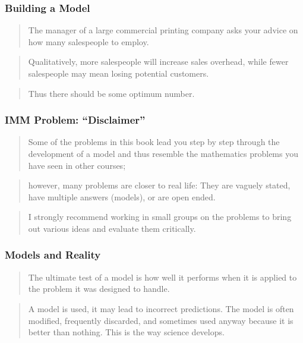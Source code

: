 \begin{frame}
    \frametitle{Building a Model}
    \begin{verse}
        The manager of a large commercial printing company 
        asks your advice on how many salespeople to employ.  
    \end{verse}
    \begin{verse}
        Qualitatively, more salespeople will increase sales overhead,
        while fewer salespeople may mean losing potential customers. 
    \end{verse}
    \begin{verse}
       Thus there should be some optimum number.
    \end{verse}
    
\end{frame}


\begin{frame}
    \frametitle{IMM Problem: ``Disclaimer''}
    \begin{verse}
        Some of the problems in this book lead you step by step through the
        development of a model and thus resemble the mathematics problems you have
        seen in other courses; 
    \end{verse} 
    \begin{verse} 
        however, many problems are closer to real life:
        They are vaguely stated, have multiple answers (models), or are open
        ended. 
    \end{verse}
    \begin{verse}
        I strongly recommend working in small groups on the problems to
        bring out various ideas and evaluate them critically.
    \end{verse}
\end{frame}

     
\begin{frame}
    \frametitle{Models and Reality}
    \begin{verse}
        The ultimate test of a model is how well it performs when 
        it is applied to the problem it was designed to handle.
    \end{verse}
    \vskip0.5in
    \begin{verse}
       A model is used, it may lead to incorrect predictions. The model is
       often modified, frequently discarded, and sometimes used anyway because
       it is better than nothing. This is the way science develops.  
    \end{verse}
\end{frame}




